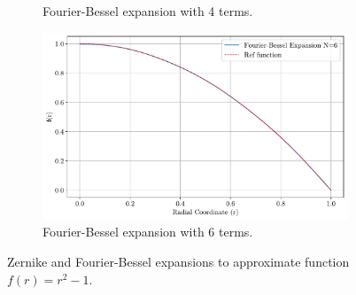 \begin{figure}
\begin{subfigure}[b]{0.48\textwidth}
        \caption{Fourier-Bessel expansion with 4 terms.}
    \end{subfigure}
    \hspace{1em}
    \begin{subfigure}[b]{0.48\textwidth}
        \centering
        \includegraphics[width=\textwidth]{figs/bessel_exp_6.pdf}
        \caption{Fourier-Bessel expansion with 6 terms.}
    \end{subfigure}
    \caption{Zernike and Fourier-Bessel expansions to approximate function $f(r)=r^2-1$.}
    \label{fig_y}
\end{figure}

